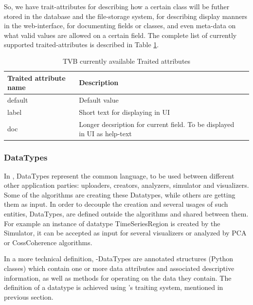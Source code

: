 So, we have trait-attributes for describing how a certain class will be futher stored in the database and the file-storage system,
for describing display manners in the web-interface, for documenting fields or classes, 
and even meta-data on what valid values are allowed on a certain field. 
The complete list of currently supported traited-attributes is described in Table \ref{tab:traits}.

\begin{center}
	\begin{table}[ht]
  	\label{tab:traits}
  	\caption{TVB currently available Traited attributes}

	\begin{tabularx}{\textwidth}{lll}
      		\toprule
      		Traited attribute name    & Description  \\ 
      		\midrule
		default 	& Default value \\
		label		& Short text for displaying in UI \\
		doc		& Longer decsription for current field. To be displayed in UI as help-text \\
		\bottomrule
    	\end{tabularx}
	\end{table}
\end{center}


	\subsubsection{DataTypes}

In \TVB, DataTypes represent the common language, to be used between different other application parties: 
uploaders, creators, analyzers, simulator and visualizers.
Some of the algorithms are creating these Datatypes, while others are getting them as input. 
In order to decouple the creation and several usages of such entities, DataTypes, are defined outside the algorithms 
and shared between them. For example an instance of datatype TimeSeriesRegion is created by the Simulator, 
it can be accepted as input for several visualizers or analyzed by PCA or CossCoherence algorithms.

In a more technical definition, \TVB-DataTypes are annotated structures (Python classes) which
contain one or more data attributes and associated descriptive information, as
well as methods for operating on the data they contain. The definition of a
datatype is achieved using \TVB's traiting system, mentioned in previous section.

